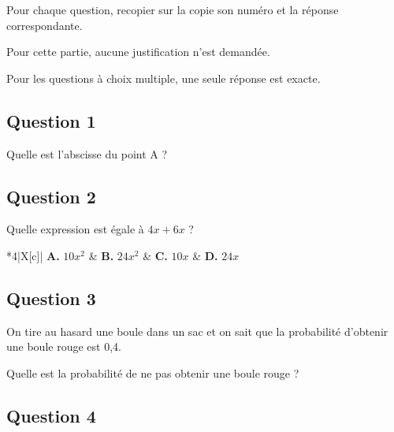 Pour chaque question, recopier sur la copie son numéro et la réponse correspondante.

Pour cette partie, aucune justification n'est demandée.

Pour les questions à choix multiple, une seule réponse est exacte.

\subsection*{Question 1}

Quelle est l'abscisse du point A ?

\begin{center}
\end{center}

\subsection*{Question 2}

Quelle expression est égale à $4x+6x$ ?

\begin{center}
\begin{tblr}{*{4}{|X[c]}|}\hline
	\textbf{A.} $10x^2$ & \textbf{B.} $24x^2$ & \textbf{C.} $10x$ & \textbf{D.} $24x$ \\
	\hline
\end{tblr}
\end{center}

\subsection*{Question 3}

On tire au hasard une boule dans un sac et on sait que la probabilité d'obtenir une boule rouge est 0,4.

Quelle est la probabilité de ne pas obtenir une boule rouge ?

\subsection*{Question 4}


